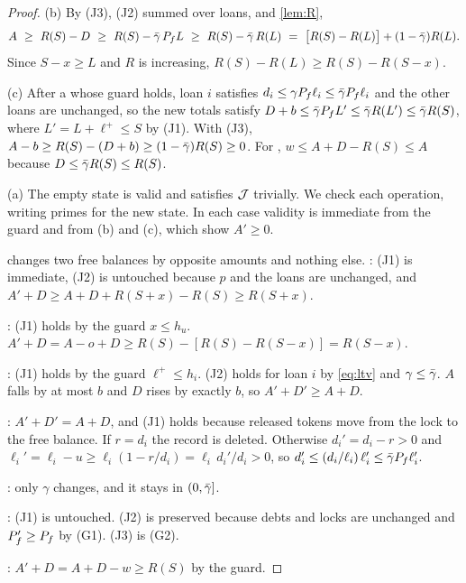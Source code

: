 \begin{proof}
(b) By (J3), (J2) summed over loans, and \cref{lem:R},
\[
A\ \ge\ R(S)-D\ \ge\ R(S)-\gbar\,\Pf L\ \ge\ R(S)-\gbar\,R(L)\ =\ \bigl[R(S)-R(L)\bigr]+(1-\gbar)R(L).
\]
Since $S-x\ge L$ and $R$ is increasing, $R(S)-R(L)\ge R(S)-R(S-x)$.

(c) After a  whose guard holds, loan $i$ satisfies $d_i\le\gamma P_f\ell_i\le\bar\gamma P_f\ell_i$ and the other loans are unchanged, so the new totals satisfy $D+b\le\bar\gamma P_f L'\le\bar\gamma R(L')\le\bar\gamma R(S)$, where $L'=L+\ell^+\le S$ by (J1). With (J3), $A-b\ge R(S)-(D+b)\ge(1-\bar\gamma)R(S)\ge0$. For , $w\le A+D-R(S)\le A$ because $D\le\bar\gamma R(S)\le R(S)$.

(a) The empty state is valid and satisfies $\mathcal{J}$ trivially. We check each operation, writing primes for the new state. In each case validity is immediate from the guard and from (b) and (c), which show $A'\ge0$.

 changes two free balances by opposite amounts and nothing else. : (J1) is immediate, (J2) is untouched because $p$ and the loans are unchanged, and $A'+D\ge A+D+R(S+x)-R(S)\ge R(S+x)$.

: (J1) holds by the guard $x\le h_u$. $A'+D=A-o+D\ge R(S)-[R(S)-R(S-x)]=R(S-x)$.

: (J1) holds by the guard $\ell^+\le h_i$. (J2) holds for loan $i$ by \eqref{eq:ltv} and $\gamma\le\bar\gamma$. $A$ falls by at most $b$ and $D$ rises by exactly $b$, so $A'+D'\ge A+D$.

: $A'+D'=A+D$, and (J1) holds because released tokens move from the lock to the free balance. If $r=d_i$ the record is deleted. Otherwise $d_i'=d_i-r>0$ and $\ell_i'=\ell_i-u\ge \ell_i(1-r/d_i)=\ell_i\,d_i'/d_i>0$, so $d_i'\le (d_i/\ell_i)\,\ell_i'\le\bar\gamma P_f\ell_i'$.

: only $\gamma$ changes, and it stays in $(0,\bar\gamma]$.

: (J1) is untouched. (J2) is preserved because debts and locks are unchanged and $P_f'\ge P_f$ by (G1). (J3) is (G2).

: $A'+D=A+D-w\ge R(S)$ by the guard.
\end{proof}

